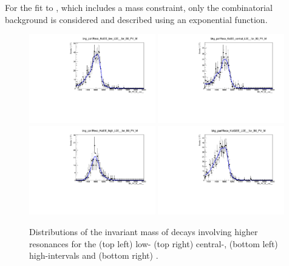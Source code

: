 %
%
For the fit to \BdToKstPsiee, which includes a \psitwos mass constraint, only the combinatorial background is considered
and described using an exponential function.
%
\begin{figure}[t!]
\centering
\includegraphics[width=0.49\textwidth]{RKst/figs/Fit/fit_EE/rooKeysModel_bkg_partReco_KstEE_low_L0E__for_B0_PV_M.pdf}
\includegraphics[width=0.49\textwidth]{RKst/figs/Fit/fit_EE/rooKeysModel_bkg_partReco_KstEE_central_L0E__for_B0_PV_M.pdf}
\includegraphics[width=0.49\textwidth]{RKst/figs/Fit/fit_EE/rooKeysModel_bkg_partReco_KstEE_high_L0E__for_B0_PV_M.pdf}
\includegraphics[width=0.49\textwidth]{RKst/figs/Fit/fit_EE/rooKeysModel_bkg_partReco_KstGEE_L0E__for_B0_PV_M.pdf}
\caption{Distributions of the \mKpiee invariant mass of decays involving
higher \Kstarz resonances for the (top left) low- (top right) central-, (bottom left) high-\qsq intervals 
and (bottom right) \BdToKstGee.}
\label{fig:misreco}


\end{figure}
